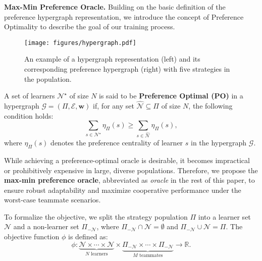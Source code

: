 \textbf{Max-Min Preference Oracle. }
Building on the basic definition of the preference hypergraph representation, we introduce the concept of Preference Optimality to describe the goal of our training process.



\begin{figure}[!ht]
    \centering
    \texttt{[image: figures/hypergraph.pdf]}
    \caption{An example of a hypergraph representation (left) and its corresponding preference hypergraph (right) with five strategies in the population.}
    \vspace{-3mm}
    \label{fig:model}
\end{figure}

\begin{definition}
    A set of learners \(\mathcal{N}^\star\) of size \(N\) is said to be \textbf{Preference Optimal (PO)} in a hypergraph \(\mathcal{G} = (\Pi, \mathcal{E}, \mathbf{w})\) if, for any set \(\hat{\mathcal{N}} \subseteq \Pi\) of size \(N\), the following condition holds:
    \begin{equation}
        \sum_{s \in \mathcal{N}^\star} \eta_\Pi(s) \geq \sum_{s \in \hat{\mathcal{N}}} \eta_\Pi(s),
    \end{equation}
    where \(\eta_\Pi(s)\) denotes the preference centrality of learner \(s\) in the hypergraph \(\mathcal{G}\).
\end{definition}

While achieving a preference-optimal oracle is desirable, it becomes impractical or prohibitively expensive in large, diverse populations. Therefore, we propose the \textbf{max-min preference oracle}, abbreviated as \textit{oracle} in the rest of this paper, to ensure robust adaptability and maximize cooperative performance under the worst-case teammate scenarios.

To formalize the objective, we split the strategy population \(\Pi\) into a learner set \(\mathcal{N}\) and a non-learner set \(\Pi_{-\mathcal{N}}\), where \(\Pi_{-\mathcal{N}} \cap \mathcal{N} = \emptyset\) and \(\Pi_{-\mathcal{N}} \cup \mathcal{N} = \Pi\). The objective function \(\phi\) is defined as:
\begin{equation}
    \phi : \underbrace{\mathcal{N} \times \cdots \times \mathcal{N}}_{N \text{ learners}} \times \underbrace{\Pi_{-\mathcal{N}} \times \cdots \times \Pi_{-\mathcal{N}}}_{M \text{ teammates}} \rightarrow \mathbb{R}.
\end{equation}

